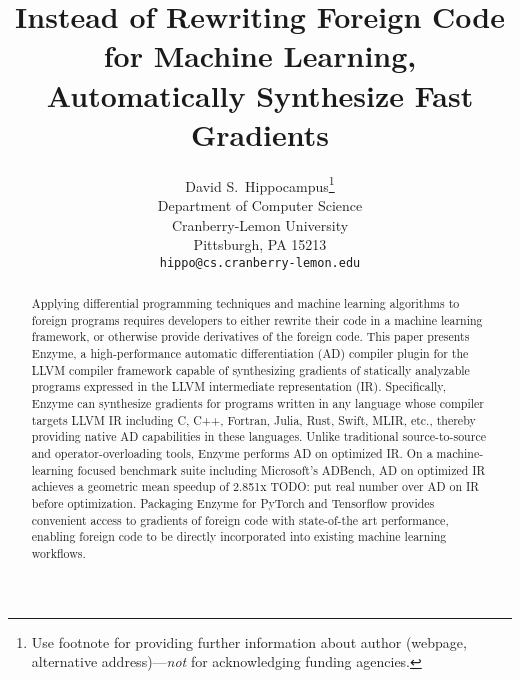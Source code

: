 \documentclass{article}
\title{Instead of Rewriting Foreign Code for Machine Learning, Automatically Synthesize Fast Gradients}
\author{%
  David S.~Hippocampus\thanks{Use footnote for providing further information
    about author (webpage, alternative address)---\emph{not} for acknowledging
    funding agencies.} \\
  Department of Computer Science\\
  Cranberry-Lemon University\\
  Pittsburgh, PA 15213 \\
  \texttt{hippo@cs.cranberry-lemon.edu} \\
}
\newcommand{\todo}[1]{{\color{red} TODO: #1}}
\begin{document}


\maketitle


\begin{abstract}
Applying differential programming techniques and machine learning algorithms to foreign programs requires developers to either rewrite their code in a machine learning framework, or otherwise provide derivatives of the foreign code.
This paper presents Enzyme, a high-performance automatic differentiation (AD) compiler plugin for the LLVM compiler framework capable of synthesizing gradients of statically analyzable programs expressed in the LLVM intermediate representation (IR). Specifically, Enzyme can synthesize gradients for programs written in any language whose compiler targets LLVM IR including C, C++, Fortran, Julia, Rust, Swift, MLIR, etc., thereby providing native AD capabilities in these languages. Unlike traditional source-to-source and operator-overloading tools, Enzyme performs AD on optimized IR. On a machine-learning focused benchmark suite including Microsoft's ADBench, AD on optimized IR achieves a geometric mean speedup of 2.851x\todo{put real number} over AD on IR before optimization. Packaging Enzyme for PyTorch and Tensorflow provides convenient access to gradients of foreign code with state-of-the art performance, enabling foreign code to be directly incorporated into existing machine learning workflows. 
\end{abstract}









\end{document}
